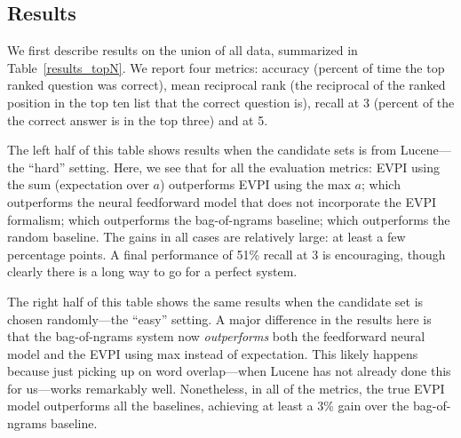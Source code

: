 \documentclass[11pt,a4paper]{article}
\begin{document}


\subsection{Results}

We first describe results on the union of all data, summarized in Table~\ref{results_topN}.
We report four metrics: accuracy (percent of time the top ranked question was correct),
mean reciprocal rank (the reciprocal of the ranked position in the top ten list that the correct question is), 
recall at 3 (percent of the the correct answer is in the top three) and
at 5.

The left half of this table shows results when the candidate sets is from Lucene---the ``hard'' setting.
Here, we see that for all the evaluation metrics:
EVPI using the sum (expectation over $a$) outperforms
EVPI using the max $a$;
which outperforms the neural feedforward model that does not incorporate the EVPI formalism;
which outperforms the bag-of-ngrams baseline;
which outperforms the random baseline.
The gains in all cases are relatively large: at least a few percentage points.
A final performance of 51\% recall at 3 is encouraging, though clearly there is a long way to go for a perfect system.

The right half of this table shows the same results when the candidate set is chosen randomly---the ``easy'' setting.
A major difference in the results here is that the bag-of-ngrams system now \emph{outperforms} both the feedforward neural model and the EVPI using max instead of expectation.
This likely happens because just picking up on word overlap---when Lucene has not already done this for us---works remarkably well.
Nonetheless, in all of the metrics, the true EVPI model outperforms all the baselines, achieving at least a 3\% gain over the bag-of-ngrams baseline.
\end{document}
